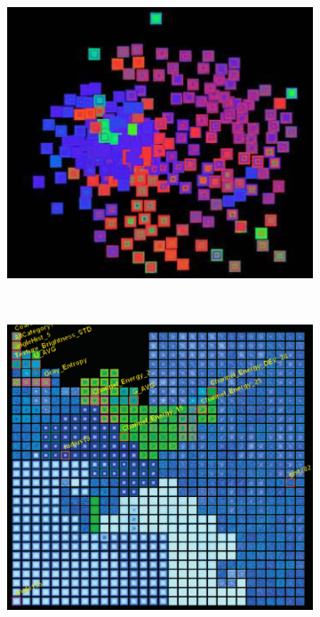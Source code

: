 \begin{figure}[h!]
  \centering
  \begin{subfigure}[b]{0.5\textwidth}
    \centering
    \includegraphics[width=\textwidth]{images/var1.png}
    \caption{}
    \label{fig:var1}
  \end{subfigure}%
  ~ %
  \begin{subfigure}[b]{0.475\textwidth}
    \centering
    \includegraphics[width=\textwidth]{images/var2.png}

\end{subfigure}
\end{figure}

